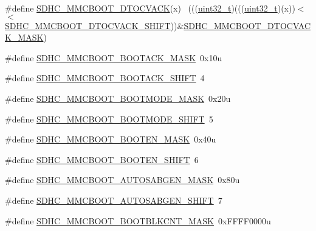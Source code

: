\begin{DoxyCompactItemize}
\#define \hyperlink{group___s_d_h_c___register___masks_gaa0d698c460ad86e2bc6573e54879cb43}{S\+D\+H\+C\+\_\+\+M\+M\+C\+B\+O\+O\+T\+\_\+\+D\+T\+O\+C\+V\+A\+CK}(x)                              ~(((\hyperlink{_p_e___types_8h_a33594304e786b158f3fb30289278f5af}{uint32\+\_\+t})(((\hyperlink{_p_e___types_8h_a33594304e786b158f3fb30289278f5af}{uint32\+\_\+t})(x))$<$$<$\hyperlink{group___s_d_h_c___register___masks_ga63ba85bfa2ccf68011e8afcf6f2c03b4}{S\+D\+H\+C\+\_\+\+M\+M\+C\+B\+O\+O\+T\+\_\+\+D\+T\+O\+C\+V\+A\+C\+K\+\_\+\+S\+H\+I\+FT}))\&\hyperlink{group___s_d_h_c___register___masks_ga243f17fb68ebb17a8a62a31a34530a1f}{S\+D\+H\+C\+\_\+\+M\+M\+C\+B\+O\+O\+T\+\_\+\+D\+T\+O\+C\+V\+A\+C\+K\+\_\+\+M\+A\+SK})
\item 
\#define \hyperlink{group___s_d_h_c___register___masks_ga878fce0feabab8806e311871a08386c9}{S\+D\+H\+C\+\_\+\+M\+M\+C\+B\+O\+O\+T\+\_\+\+B\+O\+O\+T\+A\+C\+K\+\_\+\+M\+A\+SK}~0x10u
\item 
\#define \hyperlink{group___s_d_h_c___register___masks_gadd901321f62235462c051a551b132354}{S\+D\+H\+C\+\_\+\+M\+M\+C\+B\+O\+O\+T\+\_\+\+B\+O\+O\+T\+A\+C\+K\+\_\+\+S\+H\+I\+FT}~4
\item 
\#define \hyperlink{group___s_d_h_c___register___masks_ga0cdf366302c98d1227b0092048c0ac5a}{S\+D\+H\+C\+\_\+\+M\+M\+C\+B\+O\+O\+T\+\_\+\+B\+O\+O\+T\+M\+O\+D\+E\+\_\+\+M\+A\+SK}~0x20u
\item 
\#define \hyperlink{group___s_d_h_c___register___masks_ga2f4f7807f581a3e18d0f1e9f151f74b3}{S\+D\+H\+C\+\_\+\+M\+M\+C\+B\+O\+O\+T\+\_\+\+B\+O\+O\+T\+M\+O\+D\+E\+\_\+\+S\+H\+I\+FT}~5
\item 
\#define \hyperlink{group___s_d_h_c___register___masks_ga0e740cc62404161ed68d4ce1ecf30971}{S\+D\+H\+C\+\_\+\+M\+M\+C\+B\+O\+O\+T\+\_\+\+B\+O\+O\+T\+E\+N\+\_\+\+M\+A\+SK}~0x40u
\item 
\#define \hyperlink{group___s_d_h_c___register___masks_ga1c83fde2fa55c8091ecd1768300614be}{S\+D\+H\+C\+\_\+\+M\+M\+C\+B\+O\+O\+T\+\_\+\+B\+O\+O\+T\+E\+N\+\_\+\+S\+H\+I\+FT}~6
\item 
\#define \hyperlink{group___s_d_h_c___register___masks_gaf80857b20ac681cf157b8012b2cbaaa3}{S\+D\+H\+C\+\_\+\+M\+M\+C\+B\+O\+O\+T\+\_\+\+A\+U\+T\+O\+S\+A\+B\+G\+E\+N\+\_\+\+M\+A\+SK}~0x80u
\item 
\#define \hyperlink{group___s_d_h_c___register___masks_ga2115330345a0a216c1d1721e84b32ea2}{S\+D\+H\+C\+\_\+\+M\+M\+C\+B\+O\+O\+T\+\_\+\+A\+U\+T\+O\+S\+A\+B\+G\+E\+N\+\_\+\+S\+H\+I\+FT}~7
\item 
\#define \hyperlink{group___s_d_h_c___register___masks_ga29920c6061ebeaf7ebbba8dadf5bdf21}{S\+D\+H\+C\+\_\+\+M\+M\+C\+B\+O\+O\+T\+\_\+\+B\+O\+O\+T\+B\+L\+K\+C\+N\+T\+\_\+\+M\+A\+SK}~0x\+F\+F\+F\+F0000u
$$
\end{DoxyCompactItemize}
